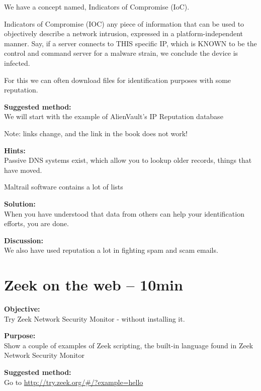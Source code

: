 \documentclass[a4paper,11pt,notitlepage]{report}
\begin{document}
We have a concept named, Indicators of Compromise (IoC).

Indicators of Compromise (IOC) any piece of information that can be used to objectively describe a network intrusion, expressed in a platform-independent manner. Say, if a server connects to THIS specific IP, which is KNOWN to be the control and command server for a malware strain, we conclude the device is infected.

For this we can often download files for identification purposes with some reputation.

{\bf Suggested method:}\\
We will start with the example of
AlienVault’s IP Reputation database

Note: links change, and the link in the book does not work!




{\bf Hints:}\\
Passive DNS systems exist, which allow you to lookup older records, things that have moved.

Maltrail software contains a lot of lists\\

{\bf Solution:}\\
When you have understood that data from others can help your identification efforts, you are done.

{\bf Discussion:}\\
We also have used reputation a lot in fighting spam and scam emails.



\chapter{Zeek on the web -- 10min}
\label{ex:zeekweb}


{\bf Objective:} \\
Try Zeek Network Security Monitor - without installing it.


{\bf Purpose:}\\
Show a couple of examples of Zeek scripting, the built-in language found in Zeek Network Security Monitor


{\bf Suggested method:}\\
Go to \url{http://try.zeek.org/#/?example=hello}
\end{document}
